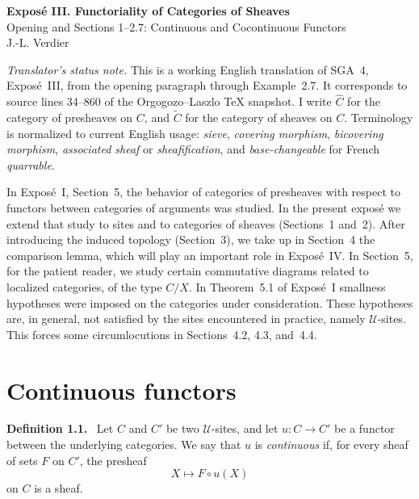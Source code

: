 \documentclass[11pt]{article}
\newcommand{\U}{\mathcal{U}}
\newenvironment{statement}[1]{\par\medskip\noindent\textbf{#1.}\ }{\par\medskip}
\begin{document}
\begin{center}
{\Large \textbf{Expos\'e III. Functoriality of Categories of Sheaves}}\\[0.35em]
{\large Opening and Sections 1--2.7: Continuous and Cocontinuous Functors}\\[0.35em]
J.-L. Verdier
\end{center}

\bigskip

\noindent\emph{Translator's status note.} This is a working English translation of SGA~4, Expos\'e~III, from the opening paragraph through Example~2.7. It corresponds to source lines 34--860 of the Orgogozo--Laszlo TeX snapshot. I write \(\widehat C\) for the category of presheaves on \(C\), and \(\widetilde C\) for the category of sheaves on \(C\). Terminology is normalized to current English usage: \emph{sieve}, \emph{covering morphism}, \emph{bicov\-ering morphism}, \emph{associated sheaf} or \emph{sheafification}, and \emph{base-changeable} for French \emph{quarrable}.

\bigskip

In Expos\'e~I, Section~5, the behavior of categories of presheaves with respect to functors between categories of arguments was studied. In the present expos\'e we extend that study to sites and to categories of sheaves (Sections~1 and~2). After introducing the induced topology (Section~3), we take up in Section~4 the comparison lemma, which will play an important role in Expos\'e~IV. In Section~5, for the patient reader, we study certain commutative diagrams related to localized categories, of the type \(C/X\). In Theorem~5.1 of Expos\'e~I smallness hypotheses were imposed on the categories under consideration. These hypotheses are, in general, not satisfied by the sites encountered in practice, namely \(\U\)-sites. This forces some circumlocutions in Sections~4.2, 4.3, and~4.4.

\section{Continuous functors}

\begin{statement}{Definition 1.1}
Let \(C\) and \(C'\) be two \(\U\)-sites, and let
\(u:C\to C'\) be a functor between the underlying categories. We say that \(u\) is \emph{continuous} if, for every sheaf of sets \(F\) on \(C'\), the presheaf
\[
X\longmapsto F\circ u(X)
\]
on \(C\) is a sheaf.
\end{statement}
\end{document}
